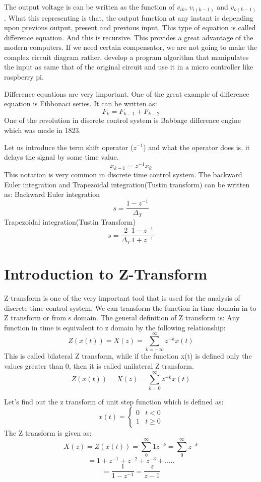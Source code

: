 \documentclass{article}
\begin{document}
The output voltage is can be written as the function of $v_{ik}$, $v_{i(k-1)}$ and $v_{o(k-1)}$. What this representing is that, the output function at any instant is depending upon previous output, present and previous input. This type of equation is called difference equation. And this is recursive. This provides a great advantage of the modern computers. If we need certain compensator, we are not going to make the complex circuit diagram rather, develop a program algorithm that manipulates the input as same that of the original circuit and use it in a micro controller like raspberry pi.

Difference equations are very important. One of the great example of difference equation is Fibbonaci series. It can be written as:
\[ F_k = F_{k-1} + F_{k-2}\]
One of the revolution in discrete control system is Babbage difference engine which was made in 1823.

Let us introduce the term shift operator ($z^{-1}$) and what the operator does is, it delays the signal by some time value.
\[x_{k-1} = z^{-1}x_k\]
This notation is very common in discrete time control system. The backward Euler integration and Trapezoidal integration(Tustin transform) can be written as:\newline
Backward Euler integration
\[s = \frac{1-z^{-1}}{\Delta_T}\]
Trapezoidal integration(Tustin Transform)
\[s = \frac{2}{\Delta_T} \frac{1-z^{-1}}{1 + z^{-1}}\]

\section{Introduction to Z-Transform}
Z-transform is one of the very important tool that is used for the analysis of discrete time control system. We can transform the function in time domain in to Z transform or from s domain. The general definition of Z transform is: Any function in time is equivalent to z domain by the following relationship:
\[Z(x(t)) =X(z) = \sum_{k = -\infty}^{\infty}z^{-k} x(t) \] 
This is called bilateral Z transform, while if the function x(t) is defined only the values greater than 0, then it is called unilateral Z transform.
\[Z(x(t)) =X(z) = \sum_{k=0}^{\infty}z^{-k} x(t) \] 

Let's find out the z transform of unit step function which is defined as:
\[x(t) = \begin{cases} 
0 & t < 0 \\
1 & t \geq 0
\end{cases}\]
The Z transform is given as:
\[X(z) = Z(x(t)) =\sum_{0}^{\infty} 1z^{-k} = \sum_{0}^{\infty}z^{-k} \]
\[= 1 + z^{-1} + z^{-2} + z^{-3} + ..... \]
\[= \frac{1}{1-z^{-1}} = \frac{z}{z-1}\]
\end{document}
